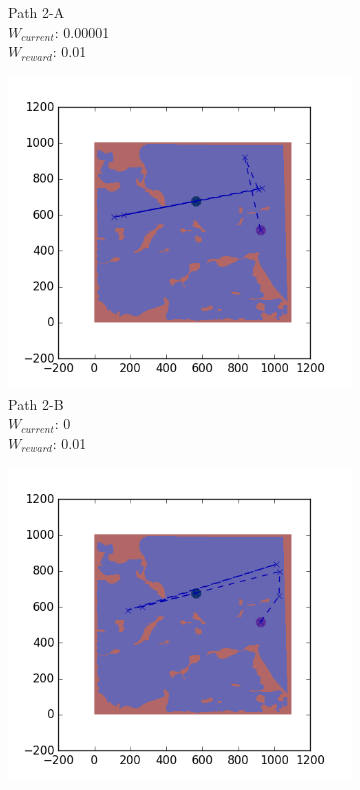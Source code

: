 \documentclass{tamuccthesis}
\begin{document}
\begin{figure}
\begin{subfigure}[b]{0.24\textwidth}
        \caption{{\small Path 2-A \\ $W_{current}$: 0.00001 \\ $W_{reward}$: 0.01}}   
        \label{fig:Path_2-A_upReward_Work}
    \end{subfigure}
  \begin{subfigure}[b]{0.24\textwidth}
        \centering
        \includegraphics[width=\textwidth,trim={4cm 3cm 2cm 3cm},clip]{EXP3RG_PathBb_-1_-1_0_0d01.png}
        \caption{{\small Path 2-B \\ $W_{current}$: 0 \\ $W_{reward}$: 0.01}}    
        \label{fig:Path_2-B_upReward_noWork}
    \end{subfigure}
    \begin{subfigure}[b]{0.24\textwidth}  
        \centering 
        \includegraphics[width=\textwidth,trim={4cm 3cm 2cm 3cm},clip]{EXP3RG_PathBb_-1_-1_-1_0d01.png}

\end{subfigure}
\end{figure}
\end{document}
